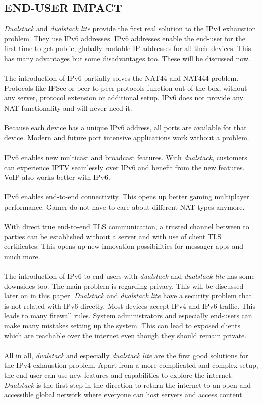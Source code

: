 \documentclass[format=sigconf, natbib=true, nonacm=true]{acmart}
\begin{document}
    \subsection*{END-USER IMPACT}
    \textit{Dualstack} and \textit{dualstack lite} provide the first real solution to the IPv4 exhaustion problem. They use IPv6 addresses. IPv6 addresses enable the end-user for the first time to get public, globally routable IP addresses for all their devices. This has many advantages but some disadvantages too. These will be discussed now.\\\\The introduction of IPv6 partially solves the NAT44 and NAT444 problem. Protocols like IPSec or peer-to-peer protocols function out of the box, without any server, protocol extension or additional setup. IPv6 does not provide any NAT functionality and will never need it.\\\\Because each device has a unique IPv6 address, all ports are available for that device. Modern and future port intensive applications work without a problem.\\\\IPv6 enables new multicast and broadcast features. With \textit{dualstack}, customers can experience IPTV seamlessly over IPv6 and benefit from the new features. VoIP also works better with IPv6. \\\\IPv6 enables end-to-end connectivity. This opens up better gaming multiplayer performance. Gamer do not have to care about different NAT types anymore.\\\\With direct true end-to-end TLS communication, a trusted channel between to parties can be established without a server and with use of client TLS certificates. This opens up new innovation possibilities for messager-apps and much more.\\\\The introduction of IPv6 to end-users with \textit{dualstack} and \textit{dualstack lite} has some downsides too. The main problem is regarding privacy. This will be discussed later on in this paper. \textit{Dualstack} and \textit{dualstack lite} have a security problem that is not related with IPv6 directly. Most devices accept IPv4 and IPv6 traffic. This leads to many firewall rules. System administrators and especially end-users can make many mistakes setting up the system. This can lead to exposed clients which are reachable over the internet even though they should remain private.\\\\All in all, \textit{dualstack} and especially \textit{dualstack lite} are the first good solutions for the IPv4 exhaustion problem. Apart from a more complicated and complex setup, the end-user can use new features and capabilities to explore the internet. \textit{Dualstack} is the first step in the direction to return the internet to an open and accessible global network where everyone can host servers and access content.
\end{document}
